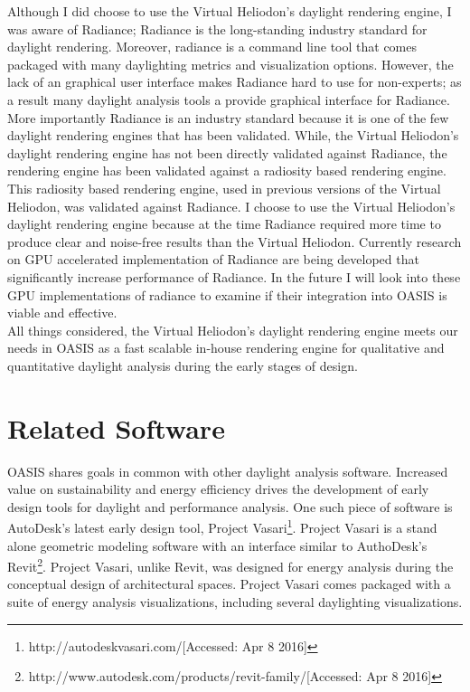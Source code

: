 	Although I did choose to use the Virtual Heliodon's daylight rendering engine, I was aware of Radiance;
	Radiance is the long-standing industry standard for daylight rendering.
	Moreover, radiance is a command line tool that comes packaged with many daylighting metrics and visualization options.
	However, the lack of an graphical user interface makes Radiance hard to use for non-experts; as a result many daylight analysis tools a provide graphical interface for Radiance.
	More importantly Radiance is an industry standard because it is one of the few daylight rendering engines that has been validated\cite{mcneil2013validation}.
	While, the Virtual Heliodon's daylight rendering engine has not been directly validated against Radiance, the rendering engine has been validated against a radiosity based rendering engine.
	This radiosity based rendering engine, used in previous versions of the Virtual Heliodon, was validated against Radiance\cite{sheng2010global}. 
	I choose to use the Virtual Heliodon's daylight rendering engine because at the time Radiance required more time to produce clear and noise-free results than the Virtual Heliodon\cite{compagnon1997radiance}. 
	Currently research on GPU accelerated implementation of Radiance are being developed that significantly increase performance of Radiance\cite{zuo2012acceleration}.
	In the future I will look into these GPU implementations of radiance to examine if their integration into OASIS is viable and effective.
	\\

	All things considered, the Virtual Heliodon's daylight rendering engine meets our needs in OASIS as a fast scalable in-house rendering engine for qualitative and quantitative daylight analysis during the early stages of design.

\section{Related Software}


	OASIS shares goals in common with other daylight analysis software.
	Increased value on sustainability and energy efficiency drives the development of early design tools for daylight and performance analysis.
	One such piece of software is AutoDesk's latest early design tool, Project Vasari\footnote{http://autodeskvasari.com/[Accessed: Apr 8 2016]}.
	Project Vasari is a stand alone geometric modeling software with an interface similar to AuthoDesk's Revit\footnote{http://www.autodesk.com/products/revit-family/[Accessed: Apr 8 2016]}.
	Project Vasari, unlike Revit, was designed for energy analysis during the conceptual design of architectural spaces. 
	Project Vasari comes packaged with a suite of energy analysis visualizations, including several daylighting visualizations.\\


